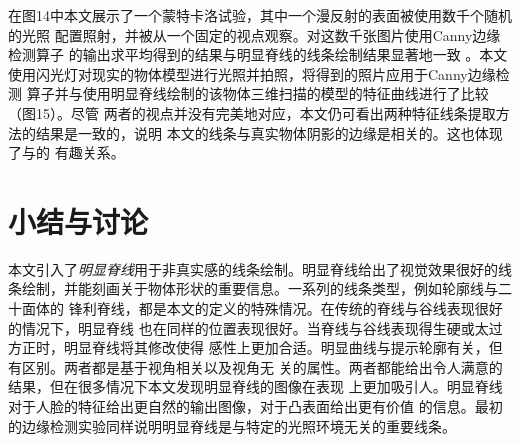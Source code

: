 \documentclass[10pt,a4paper]{article}
\theoremstyle{mythm}%
\numberwithin{equation}{section}
\begin{document}
\begin{CJK*}{UTF8}{wqyzh}
在图14中本文展示了一个蒙特卡洛试验，其中一个漫反射的表面被使用数千个随机的光照
配置照射，并被从一个固定的视点观察。对这数千张图片使用Canny边缘检测算子
\cite{Canny:1986:CAED}的输出求平均得到的结果与明显脊线的线条绘制结果显著地一致
。本文使用闪光灯对现实的物体模型进行光照并拍照，将得到的照片应用于Canny边缘检测
算子并与使用明显脊线绘制的该物体三维扫描的模型的特征曲线进行了比较（图15）。尽管
两者的视点并没有完美地对应，本文仍可看出两种特征线条提取方法的结果是一致的，说明
本文的线条与真实物体阴影的边缘是相关的。这也体现了与\cite{Raskar:2007:NPRC}的
有趣关系。


\section{小结与讨论}

本文引入了\emph{明显脊线}用于非真实感的线条绘制。明显脊线给出了视觉效果很好的线
条绘制，并能刻画关于物体形状的重要信息。一系列的线条类型，例如轮廓线与二十面体的
锋利脊线，都是本文的定义的特殊情况。在传统的脊线与谷线表现很好的情况下，明显脊线
也在同样的位置表现很好。当脊线与谷线表现得生硬或太过方正时，明显脊线将其修改使得
感性上更加合适。明显曲线与提示轮廓有关，但有区别。两者都是基于视角相关以及视角无
关的属性。两者都能给出令人满意的结果，但在很多情况下本文发现明显脊线的图像在表现
上更加吸引人。明显脊线对于人脸的特征给出更自然的输出图像，对于凸表面给出更有价值
的信息。最初的边缘检测实验同样说明明显脊线是与特定的光照环境无关的重要线条。

\end{CJK*}
\end{document}
